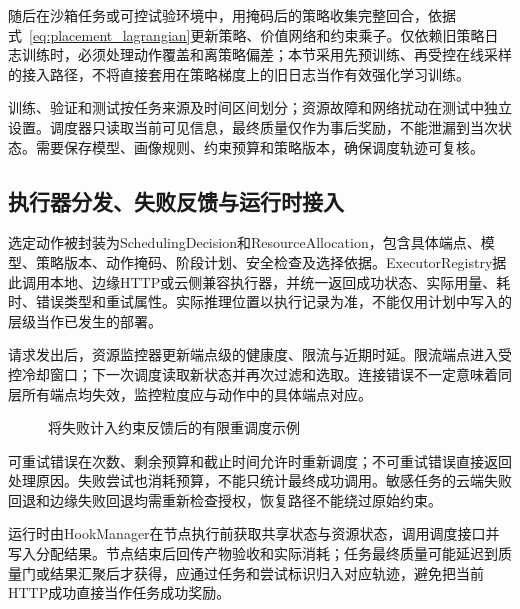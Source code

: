随后在沙箱任务或可控试验环境中，用掩码后的策略收集完整回合，依据式~\eqref{eq:placement_lagrangian}更新策略、价值网络和约束乘子。仅依赖旧策略日志训练时，必须处理动作覆盖和离策略偏差；本节采用先预训练、再受控在线采样的接入路径，不将直接套用在策略梯度上的旧日志当作有效强化学习训练。

训练、验证和测试按任务来源及时间区间划分；资源故障和网络扰动在测试中独立设置。调度器只读取当前可见信息，最终质量仅作为事后奖励，不能泄漏到当次状态。需要保存模型、画像规则、约束预算和策略版本，确保调度轨迹可复核。

\subsection{执行器分发、失败反馈与运行时接入}

选定动作被封装为SchedulingDecision和ResourceAllocation，包含具体端点、模型、策略版本、动作掩码、阶段计划、安全检查及选择依据。ExecutorRegistry据此调用本地、边缘HTTP或云侧兼容执行器，并统一返回成功状态、实际用量、耗时、错误类型和重试属性。实际推理位置以执行记录为准，不能仅用计划中写入的层级当作已发生的部署。

请求发出后，资源监控器更新端点级的健康度、限流与近期时延。限流端点进入受控冷却窗口；下一次调度读取新状态并再次过滤和选取。连接错误不一定意味着同层所有端点均失效，监控粒度应与动作中的具体端点对应。

\begin{figure}[htbp]
\centering
{}
\caption{将失败计入约束反馈后的有限重调度示例}
\label{fig:placement-reschedule}
\end{figure}

可重试错误在次数、剩余预算和截止时间允许时重新调度；不可重试错误直接返回处理原因。失败尝试也消耗预算，不能只统计最终成功调用。敏感任务的云端失败回退和边缘失败回退均需重新检查授权，恢复路径不能绕过原始约束。

运行时由HookManager在节点执行前获取共享状态与资源状态，调用调度接口并写入分配结果。节点结束后回传产物验收和实际消耗；任务最终质量可能延迟到质量门或结果汇聚后才获得，应通过任务和尝试标识归入对应轨迹，避免把当前HTTP成功直接当作任务成功奖励。

